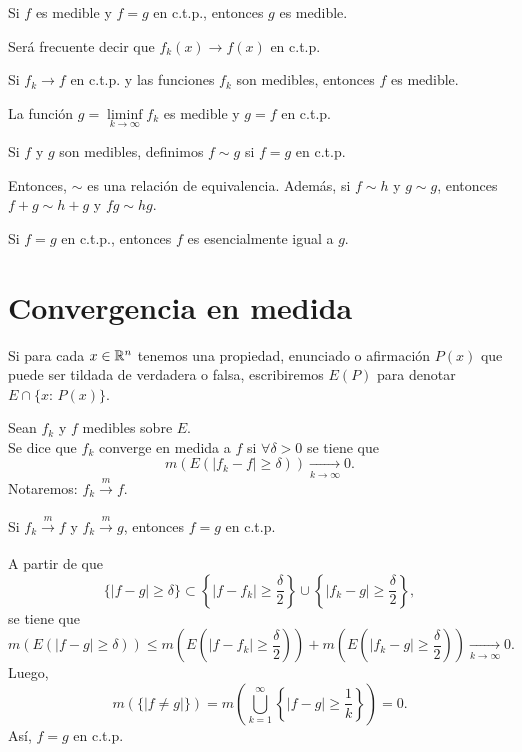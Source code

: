 \begin{corolario}{}
Si $f$ es medible y $f=g$ en c.t.p., entonces $g$ es medible. 
\end{corolario}


Ser\'a frecuente decir que $f_k(x) \to f(x)$ en c.t.p.

\begin{teorema}{}
Si $f_k \to f$ en c.t.p. y las funciones $f_k$ son medibles, entonces 
$f$ es medible.
\end{teorema}

\begin{demo}
La funci\'on $g=\liminf\limits_{k \to \infty} f_k$ es medible y $g=f$ en c.t.p.
\end{demo}

Si $f$ y $g$ son medibles, definimos $f \sim g$ si $f=g$ en c.t.p.

Entonces, $\sim$ es una relaci\'on de equivalencia. Adem\'as, si $f\sim h$ y $g \sim g$, entonces $f+g\sim h+g$ y $fg\sim hg$.

Si $f=g$ en c.t.p., entonces $f$ es esencialmente igual a $g$.

\section{Convergencia en medida}

Si para cada $x\in \mathbb{R}^n$ tenemos una propiedad, enunciado o afirmaci\'on $P(x)$ que puede ser tildada de  verdadera o falsa, escribiremos $E(P)$ para denotar $E\cap \{x:\,P(x)\}$.

\begin{definicion}{}
Sean $f_k$ y $f$  medibles sobre $E$.\\
Se dice que $f_k$ converge en medida a $f$ si $\forall \delta>0$ se tiene que 
\[
m(E(|f_k-f|\geq \delta))\xrightarrow[k \to \infty]{} 0.
\]
Notaremos: $f_k \xrightarrow[]{m} f$.
\end{definicion}

\begin{teorema}{}
Si $f_k \xrightarrow[]{m}f$ y $f_k \xrightarrow[]{m} g$, entonces
$f=g$ en c.t.p.
\end{teorema}

\begin{demo}
A partir de que 
\[
\{|f-g|\geq \delta\} \subset 
\left\{|f-f_k|\geq\frac{\delta}{2}\right\} \cup \left\{|f_k-g|\geq\frac{\delta}{2}\right\}, 
\]
se tiene que 
\[
m\left(E\left(|f-g|\geq \delta\right)\right)\leq 
m\left(E\left(|f-f_k|\geq \frac{\delta}{2}\right)\right)+
m\left(E\left(|f_k-g|\geq \frac{\delta}{2}\right)\right) \xrightarrow[k \to \infty]{} 0.
\]
Luego, 
\[
m(\{|f\neq g|\})=
m\left( \bigcup\limits_{k=1}^{\infty} \left\{|f-g|\geq \frac{1}{k}  \right\} \right)=0.
\]
As\'i, $f=g$ en c.t.p.
\end{demo}



